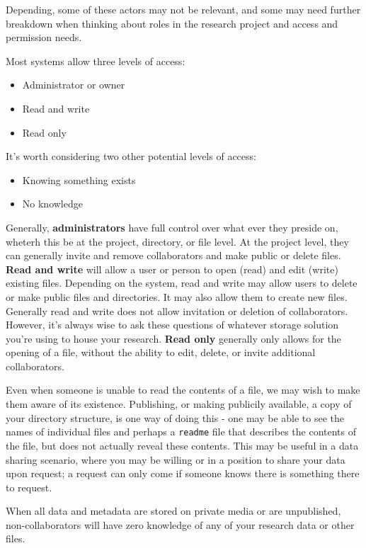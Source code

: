\documentclass[
]{book}
\providecommand{\tightlist}{%
  \setlength{\itemsep}{0pt}\setlength{\parskip}{0pt}}
\begin{document}
Depending, some of these actors may not be relevant, and some may need further breakdown when thinking about roles in the research project and access and permission needs.

Most systems allow three levels of access:

\begin{itemize}
\tightlist
\item
  Administrator or owner
\item
  Read and write
\item
  Read only
\end{itemize}

It's worth considering two other potential levels of access:

\begin{itemize}
\tightlist
\item
  Knowing something exists
\item
  No knowledge
\end{itemize}

Generally, \textbf{administrators} have full control over what ever they preside on, wheterh this be at the project, directory, or file level. At the project level, they can generally invite and remove collaborators and make public or delete files. \textbf{Read and write} will allow a user or person to open (read) and edit (write) existing files. Depending on the system, read and write may allow users to delete or make public files and directories. It may also allow them to create new files. Generally read and write does not allow invitation or deletion of collaborators. However, it's always wise to ask these questions of whatever storage solution you're using to house your research. \textbf{Read only} generally only allows for the opening of a file, without the ability to edit, delete, or invite additional collaborators.

Even when someone is unable to read the contents of a file, we may wish to make them aware of its existence. Publishing, or making publicily available, a copy of your directory structure, is one way of doing this - one may be able to see the names of individual files and perhaps a \texttt{readme} file that describes the contents of the file, but does not actually reveal these contents. This may be useful in a data sharing scenario, where you may be willing or in a position to share your data upon request; a request can only come if someone knows there is something there to request.

When all data and metadata are stored on private media or are unpublished, non-collaborators will have zero knowledge of any of your research data or other files.
\end{document}

